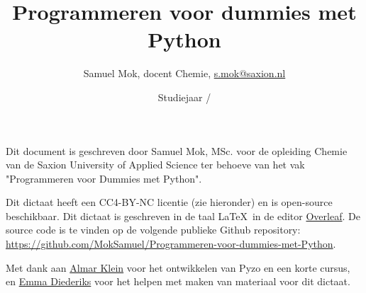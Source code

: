 \documentclass[a4paper,12pt,oneside]{book}
\title{Programmeren voor dummies met Python}
\author{Samuel Mok, docent Chemie, \href{s.mok@saxion.nl}{\textsf{s.mok@saxion.nl}}}
\date{Studiejaar \PrevYear/\the\year}
\begin{document}
\lstset{language=python}
\lstset{style=mystyle}

\maketitle

Dit document is geschreven door Samuel Mok, MSc. voor de opleiding Chemie van de Saxion University of Applied Science ter behoeve van het vak "Programmeren voor Dummies met Python". 


Dit dictaat heeft een CC4-BY-NC licentie (zie hieronder) en is open-source beschikbaar. Dit dictaat is geschreven in de taal \LaTeX\ in de editor \href{https://www.overleaf.com}{Overleaf}. De source code is te vinden op de volgende publieke Github repository: \href{https://github.com/MokSamuel/Programmeren-voor-dummies-met-Python}{https://github.com/MokSamuel/Programmeren-voor-dummies-met-Python}.


\doclicenseThis

Met dank aan \href{https://almarklein.org/}{Almar Klein} voor het ontwikkelen van Pyzo en een korte cursus, en \href{https://www.linkedin.com/in/emma-diederiks-75a3b166}{Emma Diederiks} voor het helpen met maken van materiaal voor dit dictaat.
\tableofcontents





\begin{appendices}

\end{appendices}
\end{document}
